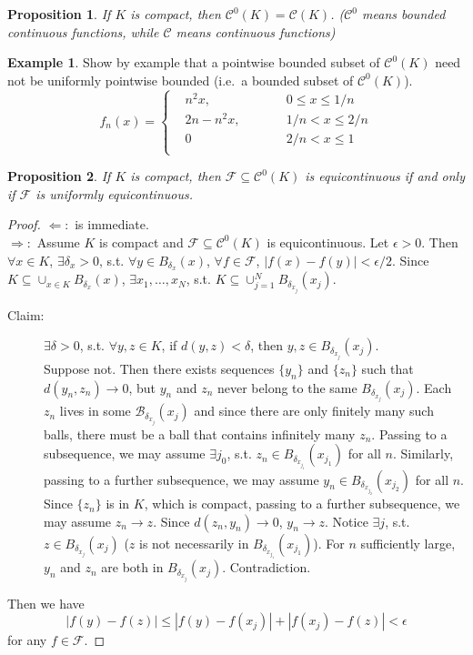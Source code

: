 \documentclass[12pt]{article}
\theoremstyle{plain}
\newtheorem*{prop}{Proposition}
\theoremstyle{definition}
\newtheorem*{eg}{Example}
\begin{document}
\begin{prop}
    If $K$ is compact, then $\mathcal{C}^0(K)=\mathcal{C}(K)$.
    ($\mathcal{C}^0$ means bounded continuous functions, while $\mathcal{C}$
    means continuous functions)
\end{prop}
\begin{eg}
    Show by example that a pointwise bounded subset of $\mathcal{C}^0(K)$ need
    not be uniformly pointwise bounded (i.e.\ a bounded subset of
    $\mathcal{C}^0(K)$).
    $$f_n(x)=\left\{
        \begin{aligned}
        &n^2x,&&0\leq x\leq 1/n\\
        &2n-n^2x,\qquad&&1/n<x\leq2/n\\
        &0&&2/n<x\leq1\\
        \end{aligned}
    \right.$$
\end{eg}

\begin{prop}
    If $K$ is compact, then $\mathcal{F}\subseteq\mathcal{C}^0(K)$ is
    equicontinuous if and only if $\mathcal{F}$ is uniformly equicontinuous.
\end{prop}
\begin{proof}
    $\Leftarrow:$ is immediate.\\
    $\Rightarrow:$ Assume $K$ is compact and
    $\mathcal{F}\subseteq\mathcal{C}^0(K)$ is equicontinuous.
    Let $\epsilon>0$.
    Then $\forall x\in K$, $\exists \delta_x>0$, s.t.
    $\forall y\in B_{\delta_x}(x)$, $\forall f\in\mathcal{F}$, $|f(x)-f(y)|<\epsilon/2$.
    Since $K\subseteq \cup_{x\in K}B_{\delta_x}(x)$, $\exists x_1,\ldots,x_N$,
    s.t.
    $K\subseteq\cup_{j=1}^N B_{\delta_{x_j}}(x_j)$.
    \begin{description}
        \item[Claim: ]
        $\exists \delta>0$, s.t. $\forall y,z\in K$, if $d(y,z)<\delta$, then
        $y,z\in B_{\delta_{x_j}}(x_j)$.\\
        Suppose not. Then there exists sequences $\{y_n\}$ and $\{z_n\}$ such
        that $d(y_n,z_n)\rightarrow0$, but $y_n$ and $z_n$ never belong to the
        same $B_{\delta_{x_j}}(x_j)$.
        Each $z_n$ lives in some $\mathcal{B}_{\delta_{x_j}}(x_j)$ and since
        there are only
        finitely many such balls, there must be a ball that contains infinitely
        many $z_n$.
        Passing to a subsequence, we may assume $\exists j_0$, s.t. $z_n\in
        B_{\delta_{x_{j_1}}}(x_{j_1})$ for all $n$.
        Similarly, passing to a further subsequence, we may assume $y_n\in
        B_{\delta_{x_{j_2}}}(x_{j_2})$ for all $n$.
        Since $\{z_n\}$ is in $K$, which is compact, passing to a further
        subsequence, we may assume $z_n\rightarrow z$.
        Since $d(z_n,y_n)\rightarrow0$, $y_n\rightarrow z$.
        Notice $\exists j$, s.t. $z\in B_{\delta_{x_j}}(x_j)$ ($z$ is not
        necessarily in $B_{\delta_{x_{j_1}}}(x_{j_1})$).
        For $n$ sufficiently large, $y_n$ and $z_n$ are both in
        $B_{\delta_{x_j}}(x_j)$.
        Contradiction.
    \end{description}
    Then we have
    $$|f(y)-f(z)|\leq|f(y)-f(x_j)|+|f(x_j)-f(z)|<\epsilon$$
    for any $f\in\mathcal{F}$.
\end{proof}
\end{document}
